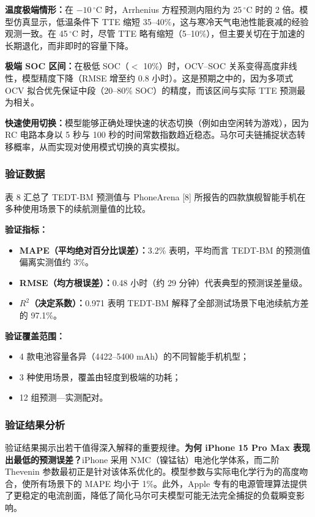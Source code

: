 \documentclass[11pt,a4paper]{ctexart}
\begin{document}
\textbf{温度极端情形：}在 $-10\,^{\circ}$C 时，Arrhenius 方程预测内阻约为 25\,$^{\circ}$C 时的 2 倍。模型仿真显示，低温条件下 TTE 缩短 35--40\%，这与寒冷天气电池性能衰减的经验观测一致。在 45\,$^{\circ}$C 时，尽管 TTE 略有缩短（5--10\%），但主要关切在于加速的长期退化，而非即时的容量下降。

\textbf{极端 SOC 区间：}在极低 SOC（$<$ 10\%）时，OCV--SOC 关系变得高度非线性，模型精度下降（RMSE 增至约 0.8 小时）。这是预期之中的，因为多项式 OCV 拟合优先保证中段（20--80\% SOC）的精度，而该区间与实际 TTE 预测最为相关。

\textbf{快速使用切换：}模型能够正确处理快速的状态切换（例如由空闲转为游戏），因为 RC 电路本身以 5 秒与 100 秒的时间常数指数趋近稳态。马尔可夫链捕捉状态转移概率，从而实现对使用模式切换的真实模拟。

\subsubsection{验证数据}

表 8 汇总了 TEDT-BM 预测值与 PhoneArena [8] 所报告的四款旗舰智能手机在多种使用场景下的续航测量值的比较。

\textbf{验证指标：}
\begin{itemize}[leftmargin=1.6em,itemsep=0.2em]
\item \textbf{MAPE（平均绝对百分比误差）：}3.2\% 表明，平均而言 TEDT-BM 的预测值偏离实测值约 3\%。
\item \textbf{RMSE（均方根误差）：}0.48 小时（约 29 分钟）代表典型的预测误差量级。
\item \textbf{$R^2$（决定系数）：}0.971 表明 TEDT-BM 解释了全部测试场景下电池续航方差的 97.1\%。
\end{itemize}

\textbf{验证覆盖范围：}
\begin{itemize}[leftmargin=1.6em,itemsep=0.2em]
\item 4 款电池容量各异（4422--5400 mAh）的不同智能手机机型；
\item 3 种使用场景，覆盖由轻度到极端的功耗；
\item 12 组预测—实测配对。
\end{itemize}

\subsubsection{验证结果分析}

验证结果揭示出若干值得深入解释的重要规律。\textbf{为何 iPhone 15 Pro Max 表现出最低的预测误差？}iPhone 采用 NMC（镍锰钴）电池化学体系，而二阶 Thevenin 参数最初正是针对该体系优化的。模型参数与实际电化学行为的高度吻合，使所有场景下的 MAPE 均小于 1\%。此外，Apple 专有的电源管理算法提供了更稳定的电流剖面，降低了简化马尔可夫模型可能无法完全捕捉的负载瞬变影响。
\end{document}
